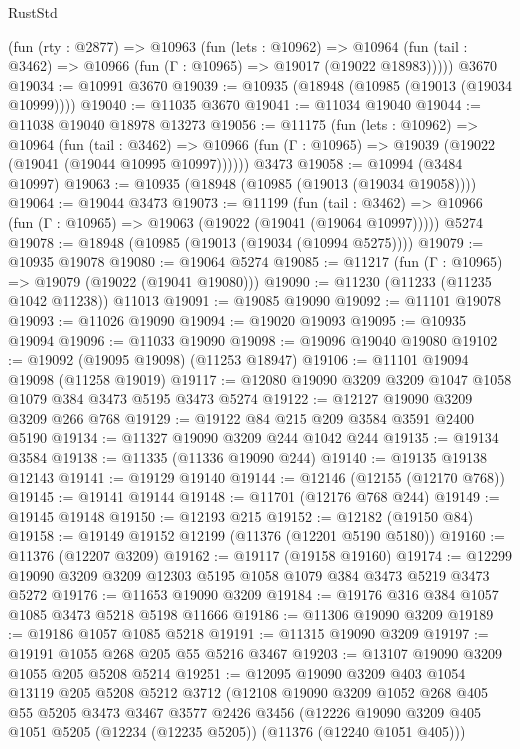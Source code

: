 \begin{lexlean}{RustStd}
\begin{coremodule}
{{{{{{{{{{{{{{{{{{{    (fun (rty : @2877) =>
    @10963
      (fun (lets : @10962) =>
      @10964 (fun (tail : @3462) => @10966 (fun (Γ : @10965) => @19017 (@19022 @18983)))))
    @3670
@19034 := @10991 @3670
@19039 := @10935 (@18948 (@10985 (@19013 (@19034 @10999))))
@19040 := @11035 @3670
@19041 := @11034 @19040
@19044 := @11038 @19040 @18978 @13273
@19056 := @11175
    (fun (lets : @10962) =>
    @10964
      (fun (tail : @3462) =>
      @10966 (fun (Γ : @10965) => @19039 (@19022 (@19041 (@19044 @10995 @10997))))))
    @3473
@19058 := @10994 (@3484 @10997)
@19063 := @10935 (@18948 (@10985 (@19013 (@19034 @19058))))
@19064 := @19044 @3473
@19073 := @11199
    (fun (tail : @3462) => @10966 (fun (Γ : @10965) => @19063 (@19022 (@19041 (@19064 @10997)))))
    @5274
@19078 := @18948 (@10985 (@19013 (@19034 (@10994 @5275))))
@19079 := @10935 @19078
@19080 := @19064 @5274
@19085 := @11217 (fun (Γ : @10965) => @19079 (@19022 (@19041 @19080)))
@19090 := @11230 (@11233 (@11235 @1042 @11238)) @11013
@19091 := @19085 @19090
@19092 := @11101 @19078
@19093 := @11026 @19090
@19094 := @19020 @19093
@19095 := @10935 @19094
@19096 := @11033 @19090
@19098 := @19096 @19040 @19080
@19102 := @19092 (@19095 @19098) (@11253 @18947)
@19106 := @11101 @19094 @19098 (@11258 @19019)
@19117 := @12080 @19090 @3209 @3209 @1047 @1058 @1079 @384 @3473 @5195 @3473 @5274
@19122 := @12127 @19090 @3209 @3209 @266 @768
@19129 := @19122 @84 @215 @209 @3584 @3591 @2400 @5190
@19134 := @11327 @19090 @3209 @244 @1042 @244
@19135 := @19134 @3584
@19138 := @11335 (@11336 @19090 @244)
@19140 := @19135 @19138 @12143
@19141 := @19129 @19140
@19144 := @12146 (@12155 (@12170 @768))
@19145 := @19141 @19144
@19148 := @11701 (@12176 @768 @244)
@19149 := @19145 @19148
@19150 := @12193 @215
@19152 := @12182 (@19150 @84)
@19158 := @19149 @19152 @12199 (@11376 (@12201 @5190 @5180))
@19160 := @11376 (@12207 @3209)
@19162 := @19117 (@19158 @19160)
@19174 := @12299 @19090 @3209 @3209 @12303 @5195 @1058 @1079 @384 @3473 @5219 @3473 @5272
@19176 := @11653 @19090 @3209
@19184 := @19176 @316 @384 @1057 @1085 @3473 @5218 @5198 @11666
@19186 := @11306 @19090 @3209
@19189 := @19186 @1057 @1085 @5218
@19191 := @11315 @19090 @3209
@19197 := @19191 @1055 @268 @205 @55 @5216 @3467
@19203 := @13107 @19090 @3209 @1055 @205 @5208 @5214
@19251 := @12095
    @19090
    @3209
    @403
    @1054
    @13119
    @205
    @5208
    @5212
    @3712
    (@12108
      @19090
      @3209
      @1052
      @268
      @405
      @55
      @5205
      @3473
      @3467
      @3577
      @2426
      @3456
      (@12226 @19090 @3209 @405 @1051 @5205 (@12234 (@12235 @5205)) (@11376 (@12240 @1051 @405)))
}}}}}}}}}}}}}}}}}}}
\end{coremodule}
\end{lexlean}
